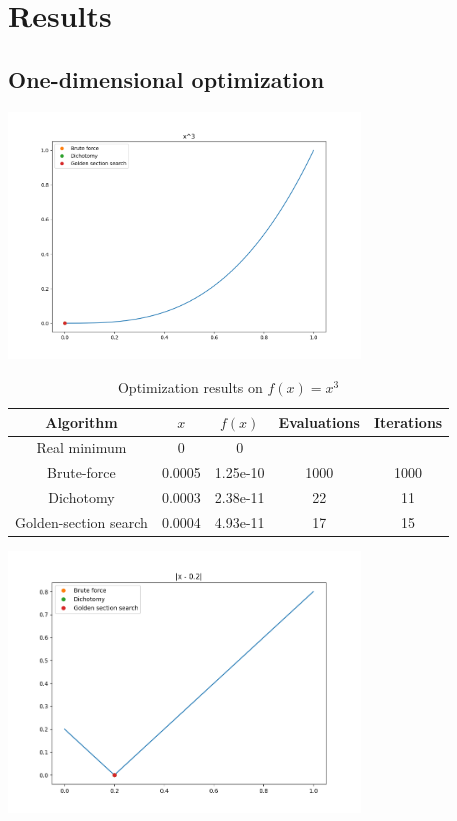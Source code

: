 \section*{Results}

\subsection*{One-dimensional optimization}
\begin{center}
    \includegraphics[width=0.7\textwidth]{../results/x_3.png}
\end{center} 

\begin{table}[h!]
    \begin{center}
        \caption{Optimization results on $f(x) = x^3$}
        \begin{tabular}{|c|c|c|c|c|}
            \textbf{Algorithm} & \textbf{$x$} & \textbf{$f(x)$} & \textbf{Evaluations} & \textbf{Iterations}\\
            \hline
            Real minimum & 0 & 0 & &\\
            Brute-force & 0.0005 & 1.25e-10 & 1000 & 1000 \\
            Dichotomy & 0.0003 & 2.38e-11 & 22 & 11 \\
            Golden-section search & 0.0004 & 4.93e-11 & 17 & 15
        \end{tabular}
    \end{center}
\end{table}

\begin{center}
    \includegraphics[width=0.7\textwidth]{../results/abs.png}
\end{center}

